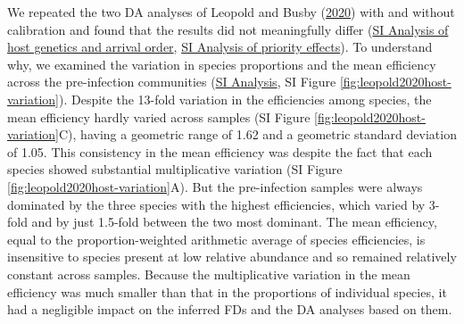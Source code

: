 \documentclass[
]{article}
\begin{document}
We repeated the two DA analyses of Leopold and Busby (\protect\hyperlink{ref-leopold2020host}{2020}) with and without calibration and found that the results did not meaningfully differ
(\href{https://mikemc.github.io/differential-abundance-theory/notebook/posts/2022-01-06-leopold2020host-original-regression-analysis/}{SI Analysis of host genetics and arrival order},
\href{https://mikemc.github.io/differential-abundance-theory/notebook/posts/2022-01-05-leopold2020host-priority-effects/}{SI Analysis of priority effects}).
To understand why, we examined the variation in species proportions and the mean efficiency across the pre-infection communities
(\href{https://mikemc.github.io/differential-abundance-theory/notebook/posts/2022-01-08-leopold2020host-case-study/}{SI Analysis},
SI Figure \ref{fig:leopold2020host-variation}).
Despite the 13-fold variation in the efficiencies among species, the mean efficiency hardly varied across samples (SI Figure \ref{fig:leopold2020host-variation}C), having a geometric range of 1.62 and a geometric standard deviation of 1.05.
This consistency in the mean efficiency was despite the fact that each species showed substantial multiplicative variation (SI Figure \ref{fig:leopold2020host-variation}A).
But the pre-infection samples were always dominated by the three species with the highest efficiencies, which varied by 3-fold and by just 1.5-fold between the two most dominant.
The mean efficiency, equal to the proportion-weighted arithmetic average of species efficiencies, is insensitive to species present at low relative abundance and so remained relatively constant across samples.
Because the multiplicative variation in the mean efficiency was much smaller than that in the proportions of individual species, it had a negligible impact on the inferred FDs and the DA analyses based on them.
\end{document}
